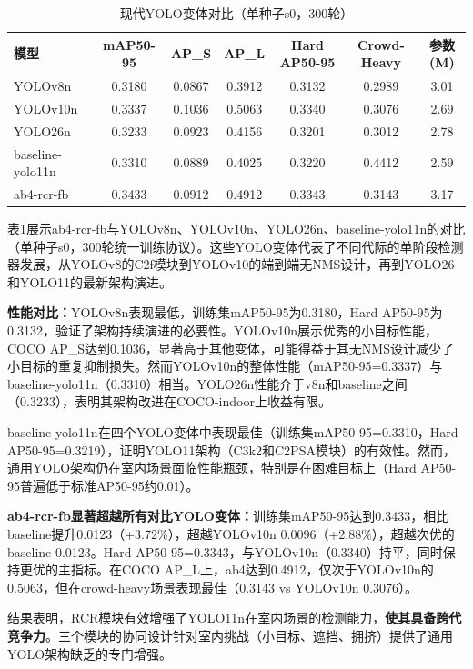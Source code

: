 \documentclass[journal]{IEEEtran}
\begin{document}
\begin{table}[t]
\caption{现代YOLO变体对比（单种子s0，300轮）}
\label{tab:yolo_comparison}
\centering
\small
\begin{tabular}{lcccccc}
\toprule
\textbf{模型} & \textbf{mAP50-95} & \textbf{AP\_S} & \textbf{AP\_L} & \textbf{Hard AP50-95} & \textbf{Crowd-Heavy} & \textbf{参数(M)} \\
\midrule
YOLOv8n & 0.3180 & 0.0867 & 0.3912 & 0.3132 & 0.2989 & 3.01 \\
YOLOv10n & 0.3337 & 0.1036 & 0.5063 & 0.3340 & 0.3076 & 2.69 \\
YOLO26n & 0.3233 & 0.0923 & 0.4156 & 0.3201 & 0.3012 & 2.78 \\
baseline-yolo11n & 0.3310 & 0.0889 & 0.4025 & 0.3220 & 0.4412 & 2.59 \\
ab4-rcr-fb & 0.3433 & 0.0912 & 0.4912 & 0.3343 & 0.3143 & 3.17 \\
\bottomrule
\end{tabular}
\end{table}

表\ref{tab:yolo_comparison}展示ab4-rcr-fb与YOLOv8n、YOLOv10n、YOLO26n、baseline-yolo11n的对比（单种子s0，300轮统一训练协议）。这些YOLO变体代表了不同代际的单阶段检测器发展，从YOLOv8的C2f模块到YOLOv10的端到端无NMS设计，再到YOLO26和YOLO11的最新架构演进。

\textbf{性能对比：}YOLOv8n表现最低，训练集mAP50-95为0.3180，Hard AP50-95为0.3132，验证了架构持续演进的必要性。YOLOv10n展示优秀的小目标性能，COCO AP\_S达到0.1036，显著高于其他变体，可能得益于其无NMS设计减少了小目标的重复抑制损失。然而YOLOv10n的整体性能（mAP50-95=0.3337）与baseline-yolo11n（0.3310）相当。YOLO26n性能介于v8n和baseline之间（0.3233），表明其架构改进在COCO-indoor上收益有限。

baseline-yolo11n在四个YOLO变体中表现最佳（训练集mAP50-95=0.3310，Hard AP50-95=0.3219），证明YOLO11架构（C3k2和C2PSA模块）的有效性。然而，通用YOLO架构仍在室内场景面临性能瓶颈，特别是在困难目标上（Hard AP50-95普遍低于标准AP50-95约0.01）。

\textbf{ab4-rcr-fb显著超越所有对比YOLO变体：}训练集mAP50-95达到0.3433，相比baseline提升0.0123（+3.72\%），超越YOLOv10n 0.0096（+2.88\%），超越次优的baseline 0.0123。Hard AP50-95=0.3343，与YOLOv10n（0.3340）持平，同时保持更优的主指标。在COCO AP\_L上，ab4达到0.4912，仅次于YOLOv10n的0.5063，但在crowd-heavy场景表现最佳（0.3143 vs YOLOv10n 0.3076）。

结果表明，RCR模块有效增强了YOLO11n在室内场景的检测能力，\textbf{使其具备跨代竞争力}。三个模块的协同设计针对室内挑战（小目标、遮挡、拥挤）提供了通用YOLO架构缺乏的专门增强。
\end{document}
